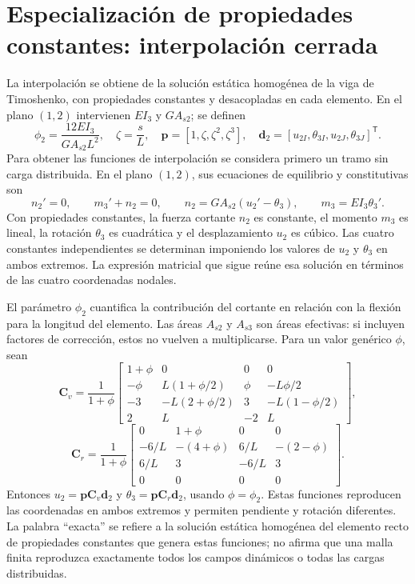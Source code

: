 \documentclass[11pt,a4paper,oneside]{report}
\newcommand{\vct}[1]{\bm{#1}}
\newcommand{\ten}[1]{\boldsymbol{#1}}
\newcommand{\tr}{\mathsf T}
\begin{document}
\section{Especialización de propiedades constantes: interpolación cerrada}

La interpolación se obtiene de la solución estática homogénea de la viga de
Timoshenko, con propiedades constantes y desacopladas en cada elemento.
En el plano $(1,2)$ intervienen $EI_3$ y
$GA_{s2}$; se definen
\begin{equation}
 \phi_2=\frac{12EI_3}{GA_{s2}L^2},\quad
 \zeta=\frac{s}{L},\quad
 \vct p=[1,\zeta,\zeta^2,\zeta^3],\quad
 \vct d_2=[u_{2I},\theta_{3I},u_{2J},\theta_{3J}]^{\tr}.
\end{equation}
Para obtener las funciones de interpolación se considera primero un tramo sin carga distribuida. En el plano $(1,2)$, sus ecuaciones de equilibrio y constitutivas son
\begin{equation}
 n_2'=0,\qquad m_3'+n_2=0,\qquad
 n_2=GA_{s2}(u_2'-\theta_3),\qquad m_3=EI_3\theta_3'.
\end{equation}
Con propiedades constantes, la fuerza cortante $n_2$ es constante, el momento $m_3$ es lineal, la rotación $\theta_3$ es cuadrática y el desplazamiento $u_2$ es cúbico. Las cuatro constantes independientes se determinan imponiendo los valores de $u_2$ y $\theta_3$ en ambos extremos. La expresión matricial que sigue reúne esa solución en términos de las cuatro coordenadas nodales.

El parámetro $\phi_2$ cuantifica la contribución del cortante en relación con
la flexión para la longitud del elemento. Las áreas $A_{s2}$ y $A_{s3}$ son
áreas efectivas: si incluyen factores de corrección, estos no vuelven a
multiplicarse. Para un valor genérico $\phi$, sean
\begin{equation}
 \ten C_v=\frac{1}{1+\phi}
 \begin{bmatrix}
 1+\phi&0&0&0\\
 -\phi&L(1+\phi/2)&\phi&-L\phi/2\\
 -3&-L(2+\phi/2)&3&-L(1-\phi/2)\\
 2&L&-2&L
 \end{bmatrix},
\end{equation}
\begin{equation}
 \ten C_r=\frac{1}{1+\phi}
 \begin{bmatrix}
 0&1+\phi&0&0\\
 -6/L&-(4+\phi)&6/L&-(2-\phi)\\
 6/L&3&-6/L&3\\
 0&0&0&0
 \end{bmatrix}.
\end{equation}
Entonces $u_2=\vct p\ten C_v\vct d_2$ y
$\theta_3=\vct p\ten C_r\vct d_2$, usando $\phi=\phi_2$.
Estas funciones reproducen las coordenadas en ambos extremos y permiten
pendiente y rotación diferentes. La palabra ``exacta'' se refiere a la
solución estática homogénea del elemento recto de propiedades constantes que
genera estas funciones; no afirma que una malla finita reproduzca exactamente
todos los campos dinámicos o todas las cargas distribuidas.
\end{document}
